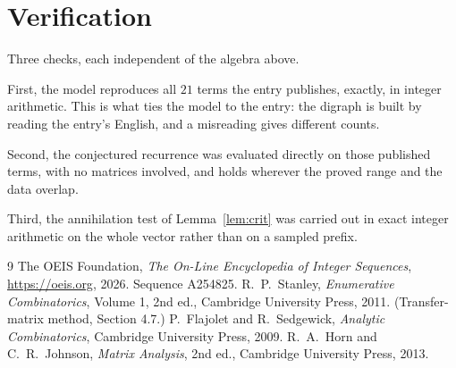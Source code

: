 \documentclass[11pt,a4paper]{article}
\theoremstyle{plain}
\theoremstyle{definition}
\begin{document}
\section{Verification}

Three checks, each independent of the algebra above.

First, the model reproduces all $21$ terms the entry publishes, exactly, in integer
arithmetic. This is what ties the model to the entry: the digraph is built by reading the
entry's English, and a misreading gives different counts.

Second, the conjectured recurrence was evaluated directly on those published terms, with no
matrices involved, and holds wherever the proved range and the data overlap.

Third, the annihilation test of Lemma~\ref{lem:crit} was carried out in exact integer
arithmetic on the whole vector rather than on a sampled prefix.

\begin{thebibliography}{9}
 The OEIS Foundation, \emph{The On-Line Encyclopedia of Integer
Sequences}, \url{https://oeis.org}, 2026. Sequence A254825.
 R.~P.~Stanley, \emph{Enumerative Combinatorics}, Volume 1, 2nd ed.,
Cambridge University Press, 2011. (Transfer-matrix method, Section 4.7.)
 P.~Flajolet and R.~Sedgewick, \emph{Analytic Combinatorics}, Cambridge
University Press, 2009.
 R.~A.~Horn and C.~R.~Johnson, \emph{Matrix Analysis}, 2nd ed., Cambridge
University Press, 2013.
\end{thebibliography}
\end{document}
